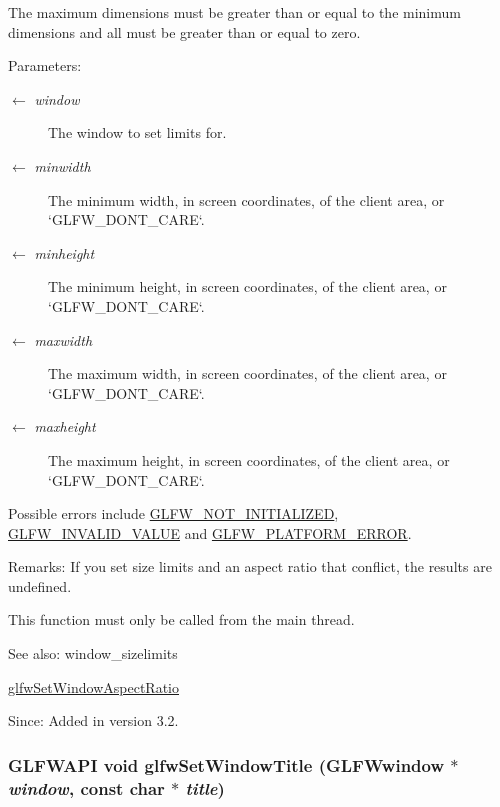 The maximum dimensions must be greater than or equal to the minimum dimensions and all must be greater than or equal to zero.

\begin{Desc}
\item[Parameters:]
\begin{description}
\item[\mbox{$\leftarrow$} {\em window}]The window to set limits for. \item[\mbox{$\leftarrow$} {\em minwidth}]The minimum width, in screen coordinates, of the client area, or `GLFW\_\-DONT\_\-CARE`. \item[\mbox{$\leftarrow$} {\em minheight}]The minimum height, in screen coordinates, of the client area, or `GLFW\_\-DONT\_\-CARE`. \item[\mbox{$\leftarrow$} {\em maxwidth}]The maximum width, in screen coordinates, of the client area, or `GLFW\_\-DONT\_\-CARE`. \item[\mbox{$\leftarrow$} {\em maxheight}]The maximum height, in screen coordinates, of the client area, or `GLFW\_\-DONT\_\-CARE`.\end{description}
\end{Desc}
Possible errors include \hyperlink{group__errors_g2374ee02c177f12e1fa76ff3ed15e14a}{GLFW\_\-NOT\_\-INITIALIZED}, \hyperlink{group__errors_gaf2ef9aa8202c2b82ac2d921e554c687}{GLFW\_\-INVALID\_\-VALUE} and \hyperlink{group__errors_gd44162d78100ea5e87cdd38426b8c7a1}{GLFW\_\-PLATFORM\_\-ERROR}.

\begin{Desc}
\item[Remarks:]If you set size limits and an aspect ratio that conflict, the results are undefined.\end{Desc}
This function must only be called from the main thread.

\begin{Desc}
\item[See also:]window\_\-sizelimits 

\hyperlink{group__window_gd2ae94a2c5ee1c46a36e13a8f4ac68ac}{glfwSetWindowAspectRatio}\end{Desc}
\begin{Desc}
\item[Since:]Added in version 3.2. \end{Desc}
\hypertarget{group__window_g861ed3414ab8120e2f74151a666ed1dc}{
\subsubsection[glfwSetWindowTitle]{\setlength{\rightskip}{0pt plus 5cm}GLFWAPI void glfwSetWindowTitle ({\bf GLFWwindow} $\ast$ {\em window}, \/  const char $\ast$ {\em title})}}
\label{group__window_g861ed3414ab8120e2f74151a666ed1dc}


